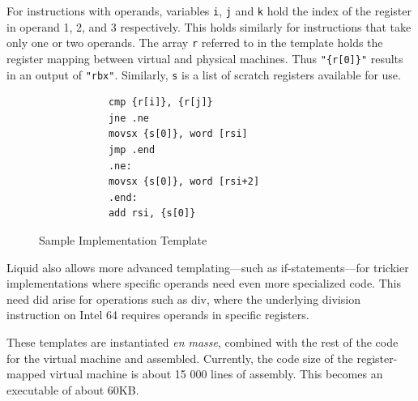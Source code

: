 \documentclass[A4]{sig-alternate}
\begin{document}
For instructions with operands, variables \texttt{i}, \texttt{j} and \texttt{k} hold the index of the register in operand 1, 2, and 3 respectively. This holds similarly for instructions that take only one or two operands. The array \texttt{r} referred to in the template holds the register mapping between virtual and physical machines. Thus \texttt{"\{r[0]\}"} results in an output of \texttt{"rbx"}. Similarly, \texttt{s} is a list of scratch registers available for use.

\begin{figure}
	\begin{center}
		\begin{minipage}[b]{0.8\linewidth}
			\begin{verbatim}
			cmp {r[i]}, {r[j]}
			jne .ne
			movsx {s[0]}, word [rsi]
			jmp .end
			.ne:
			movsx {s[0]}, word [rsi+2]
			.end:
			add rsi, {s[0]}
			\end{verbatim}
		\end{minipage}
		\caption{Sample Implementation Template}
		\label{code:template}
	\end{center}
\end{figure}
Liquid also allows more advanced templating---such as if-statements---for trickier implementations where specific operands need even more specialized code. This need did arise for operations such as div, where the underlying division instruction on Intel 64 requires operands in specific registers.

These templates are instantiated \textit{en masse}, combined with the rest of the code for the virtual machine and assembled. Currently, the code size of the register-mapped virtual machine is about 15 000 lines of assembly. This becomes an executable of about 60KB.
\end{document}
